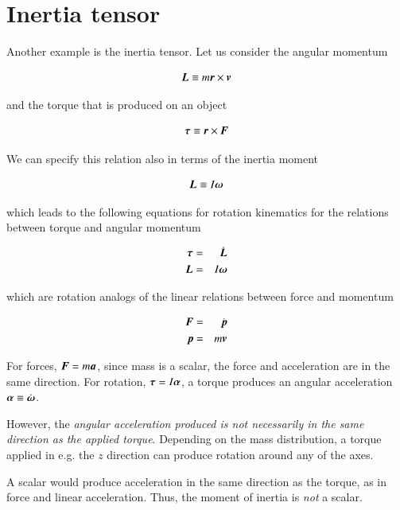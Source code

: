 \section{Inertia tensor}

Another example is the inertia tensor. Let us consider the angular momentum 

\begin{equation}
{\boldsymbol{L}} \equiv m {\boldsymbol{r}} \times {\boldsymbol{v}}  
\end{equation}


\noindent and the torque that is produced on an object 

\begin{equation}
{\boldsymbol{\tau}} \equiv {\boldsymbol{r}} \times {\boldsymbol{F}}  
\end{equation}

We can specify this relation also in terms of the inertia moment

\begin{equation}
{\boldsymbol{L}} \equiv I {\boldsymbol{\omega}} 
\end{equation}


which leads to the following equations for rotation kinematics for the relations between torque and angular momentum 


\begin{eqnarray}
{\boldsymbol{\tau}} &=& \dot{{\boldsymbol{L}}}\\
{\boldsymbol{L}} &=&I {\boldsymbol{\omega}} 
\end{eqnarray}

which are rotation analogs of the linear relations between force and momentum 

\begin{eqnarray}
{\boldsymbol{F}} &=& \dot{{\boldsymbol{p}}} \\
{\boldsymbol{p}} &=& m {\boldsymbol{v}} 
\end{eqnarray}


For forces, ${\boldsymbol{F}}=m{\boldsymbol{a}}$, since mass is a scalar, the force and acceleration are in the same direction. For rotation, ${\boldsymbol{\tau}} = I{\boldsymbol{\alpha}}$, a torque produces an angular acceleration ${\boldsymbol{\alpha}}\equiv\dot{{\boldsymbol{\omega}}}$. 


However, the {\it angular acceleration produced is not necessarily in the same direction as the applied torque}. Depending on the mass distribution, a torque applied in e.g. the $z$ direction can produce rotation around any of the axes.  

A scalar would produce acceleration in the same direction as the
torque, as in force and linear acceleration. Thus, the moment of
inertia is {\it not} a scalar. 

